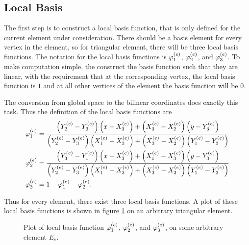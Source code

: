 \documentclass[../fem.tex]{subfile}
\begin{document}
\subsection{Local Basis}%
\label{sub:local_basis}

The first step is to construct a local basis function, that is only defined
for the current element under consideration. There should be a basis element
for every vertex in the element, so for triangular element, there will be three
local basis functions. The notation for the local basis functions is
$\varphi^{(e)}_1$, $\varphi^{(e)}_2$, and $\varphi^{(e)}_3$. To make computation simple, the
construct the basis function such that they are linear, with the requirement
that at the corresponding vertex, the local basis function is $1$ and at all
other vertices of the element the basis function will be $0$.

The conversion from global space to the bilinear coordinates does exactly this
task. Thus the definition of the local basis functions are
\begin{align}
  \begin{split}
    \varphi^{(e)}_1&=\frac{\left(Y^{(e)}_2-Y^{(e)}_3\right)\left(x-X^{(e)}_3\right)+\left(X^{(e)}_3-X^{(e)}_2\right)\left(y-Y^{(e)}_3\right)}{\left(Y^{(e)}_2-Y^{(e)}_3\right)\left(X^{(e)}_1-X^{(e)}_3\right)+\left(X^{(e)}_3-X^{(e)}_2\right)\left(Y^{(e)}_1-Y^{(e)}_3\right)}\\
    \varphi^{(e)}_2&=\frac{\left(Y^{(e)}_3-Y^{(e)}_1\right)\left(x-X^{(e)}_3\right)+\left(X^{(e)}_1-X^{(e)}_3\right)\left(y-Y^{(e)}_3\right)}{\left(Y^{(e)}_2-Y^{(e)}_3\right)\left(X^{(e)}_1-X^{(e)}_3\right)+\left(X^{(e)}_3-X^{(e)}_2\right)\left(Y^{(e)}_1-Y^{(e)}_3\right)}\\
    \varphi^{(e)}_3&=1-\varphi^{(e)}_1-\varphi^{(e)}_2.
  \end{split}
\end{align}

Thus for every element, there exist three local basis functions. A plot of
these local basis functions is shown in figure \ref{fig:local_basis} on an
arbitrary triangular element.

\begin{figure}[htpb]
  \begin{center}
  \end{center}
  \caption{Plot of local basis function $\varphi^{(e)}_1$, $\varphi^{(e)}_2$, and $\varphi^{(e)}_3$,
  on some arbitrary element $E_e$.}
  \label{fig:local_basis}
\end{figure}
\end{document}
